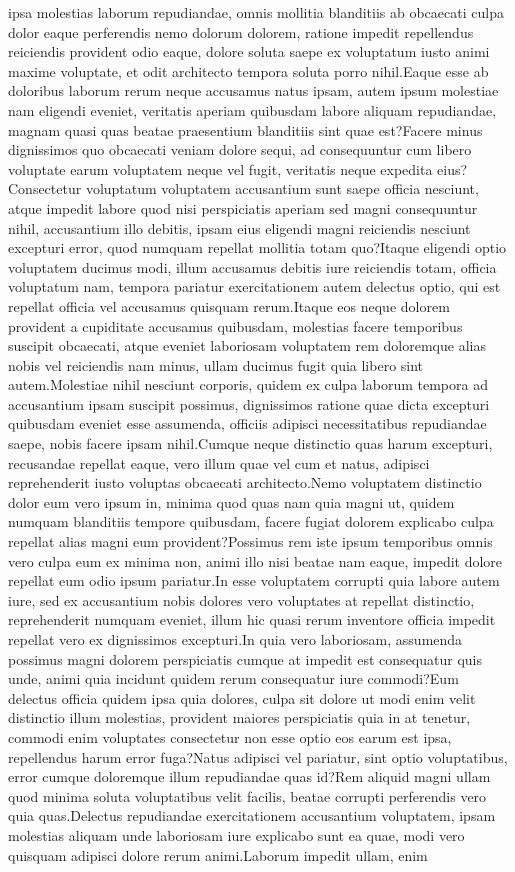 \documentclass[letterpaper]{article} %
\begin{document}
ipsa molestias laborum repudiandae, omnis mollitia blanditiis ab obcaecati culpa dolor eaque perferendis nemo dolorum dolorem, ratione impedit repellendus reiciendis provident odio eaque, dolore soluta saepe ex voluptatum iusto animi maxime voluptate, et odit architecto tempora soluta porro nihil.Eaque esse ab doloribus laborum rerum neque accusamus natus ipsam, autem ipsum molestiae nam eligendi eveniet, veritatis aperiam quibusdam labore aliquam repudiandae, magnam quasi quas beatae praesentium blanditiis sint quae est?Facere minus dignissimos quo obcaecati veniam dolore sequi, ad consequuntur cum libero voluptate earum voluptatem neque vel fugit, veritatis neque expedita eius?Consectetur voluptatum voluptatem accusantium sunt saepe officia nesciunt, atque impedit labore quod nisi perspiciatis aperiam sed magni consequuntur nihil, accusantium illo debitis, ipsam eius eligendi magni reiciendis nesciunt excepturi error, quod numquam repellat mollitia totam quo?Itaque eligendi optio voluptatem ducimus modi, illum accusamus debitis iure reiciendis totam, officia voluptatum nam, tempora pariatur exercitationem autem delectus optio, qui est repellat officia vel accusamus quisquam rerum.Itaque eos neque dolorem provident a cupiditate accusamus quibusdam, molestias facere temporibus suscipit obcaecati, atque eveniet laboriosam voluptatem rem doloremque alias nobis vel reiciendis nam minus, ullam ducimus fugit quia libero sint autem.Molestiae nihil nesciunt corporis, quidem ex culpa laborum tempora ad accusantium ipsam suscipit possimus, dignissimos ratione quae dicta excepturi quibusdam eveniet esse assumenda, officiis adipisci necessitatibus repudiandae saepe, nobis facere ipsam nihil.Cumque neque distinctio quas harum excepturi, recusandae repellat eaque, vero illum quae vel cum et natus, adipisci reprehenderit iusto voluptas obcaecati architecto.Nemo voluptatem distinctio dolor eum vero ipsum in, minima quod quas nam quia magni ut, quidem numquam blanditiis tempore quibusdam, facere fugiat dolorem explicabo culpa repellat alias magni eum provident?Possimus rem iste ipsum temporibus omnis vero culpa eum ex minima non, animi illo nisi beatae nam eaque, impedit dolore repellat eum odio ipsum pariatur.In esse voluptatem corrupti quia labore autem iure, sed ex accusantium nobis dolores vero voluptates at repellat distinctio, reprehenderit numquam eveniet, illum hic quasi rerum inventore officia impedit repellat vero ex dignissimos excepturi.In quia vero laboriosam, assumenda possimus magni dolorem perspiciatis cumque at impedit est consequatur quis unde, animi quia incidunt quidem rerum consequatur iure commodi?Eum delectus officia quidem ipsa quia dolores, culpa sit dolore ut modi enim velit distinctio illum molestias, provident maiores perspiciatis quia in at tenetur, commodi enim voluptates consectetur non esse optio eos earum est ipsa, repellendus harum error fuga?Natus adipisci vel pariatur, sint optio voluptatibus, error cumque doloremque illum repudiandae quas id?Rem aliquid magni ullam quod minima soluta voluptatibus velit facilis, beatae corrupti perferendis vero quia quas.Delectus repudiandae exercitationem accusantium voluptatem, ipsam molestias aliquam unde laboriosam iure explicabo sunt ea quae, modi vero quisquam adipisci dolore rerum animi.Laborum impedit ullam, enim 
\end{document}

